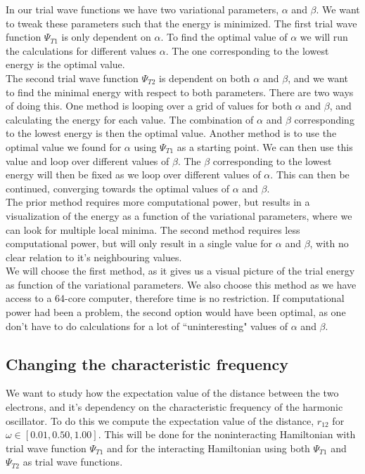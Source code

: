 \documentclass[%
 reprint,
nofootinbib,
aps,
]{revtex4-1}
\begin{document}
In our trial wave functions we have two variational parameters, $\alpha$ and $\beta$. We want to tweak these parameters such that the energy is minimized. The first trial wave function $\Psi_{T1}$ is only dependent on $\alpha$. To find the optimal value of $\alpha$ we will run the calculations for different values $\alpha$. The one corresponding to the lowest energy is the optimal value. \\
The second trial wave function $\Psi_{T2}$ is dependent on both $\alpha$ and $\beta$, and we want to find the minimal energy with respect to both parameters. There are two ways of doing this. One method is looping over a grid of values for both $\alpha$ and $\beta$, and calculating the energy for each value. The combination of $\alpha$ and $\beta$ corresponding to the lowest energy is then the optimal value. Another method is to use the optimal value we found for $\alpha$ using $\Psi_{T1}$ as a starting point. We can then use this value and loop over different values of $\beta$. The $\beta$ corresponding to the lowest energy will then be fixed as we loop over different values of $\alpha$. This can then be continued, converging towards the optimal values of $\alpha$ and $\beta$.\\
The prior method requires more computational power, but results in a visualization of the energy as a function of the variational parameters, where we can look for multiple local minima. The second method requires less computational power, but will only result in a single value for $\alpha$ and $\beta$, with no clear relation to it's neighbouring values.\\
We will choose the first method, as it gives us a visual picture of the trial energy as function of the variational parameters. We also choose this method as we have access to a 64-core computer, therefore time is no restriction. If computational power had been a problem, the second option would have been optimal, as one don't have to do calculations for a lot of ``uninteresting" values of $\alpha$ and $\beta$.

\subsection{Changing the characteristic frequency}
We want to study how the expectation value of the distance between the two electrons, and it's dependency on the characteristic frequency of the harmonic oscillator. To do this we compute the expectation value of the distance, $r_{12}$ for $\omega \in [0.01, 0.50, 1.00]$. This will be done for the noninteracting Hamiltonian with trial wave function $\Psi_{T1}$ and for the interacting Hamiltonian using both $\Psi_{T1}$ and $\Psi_{T2}$ as trial wave functions.
\end{document}
